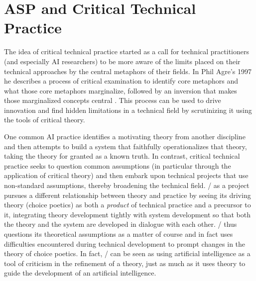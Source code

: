
\section{ASP and Critical Technical Practice}
\label{sec:dunyazad-asp-and-ctp}%

The idea of critical technical practice started as a call for technical practitioners (and especially AI researchers) to be more aware of the limits placed on their technical approaches by the central metaphors of their fields.
%
In Phil Agre's 1997  he describes a process of critical examination to identify core metaphors and what those core metaphors marginalize, followed by an inversion that makes those marginalized concepts central \citep{Agre1997}.
%
This process can be used to drive innovation and find hidden limitations in a technical field by scrutinizing it using the tools of critical theory.


One common AI practice identifies a motivating theory from another discipline and then attempts to build a system that faithfully operationalizes that theory, taking the theory for granted as a known truth.
%
In contrast, critical technical practice seeks to question common assumptions (in particular through the application of critical theory) and then embark upon technical projects that use non-standard assumptions, thereby broadening the technical field.
%
\dunyazad/ as a project pursues a different relationship between theory and practice by seeing its driving theory (choice poetics) as both a \emph{product} of technical practice and a precursor to it, integrating theory development tightly with system development so that both the theory and the system are developed in dialogue with each other.
%
\dunyazad/ thus questions its theoretical assumptions as a matter of course and in fact uses difficulties encountered during technical development to prompt changes in the theory of choice poetics.
%
In fact, \dunyazad/ can be seen as using artificial intelligence as a tool of criticism in the refinement of a theory, just as much as it uses theory to guide the development of an artificial intelligence.


